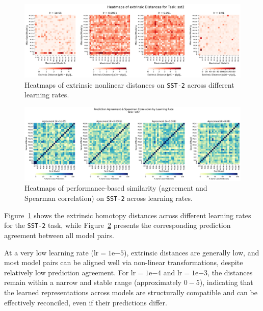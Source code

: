 \begin{figure}[h]
    \centering
    \includegraphics[width=\linewidth]{Abschlussarbeit/Pictures/heatmaps_smaller_circles/Heatmap_extrinsic_distance_all_lrs_sst2_homotopy.png}
    \caption{Heatmaps of extrinsic nonlinear distances on \texttt{SST-2} across different learning rates.}
    \label{fig:extr_sst2}
\end{figure}

\begin{figure}[h]
    \centering
    \includegraphics[width=\linewidth]{Abschlussarbeit/Pictures/PredictionAgreement_Spearman/_3Relu_final_training_HeatMap_sst2_subplots_per_lr_4.png}
    \caption{Heatmaps of performance-based similarity (agreement and Spearman correlation) on \texttt{SST-2} across learning rates.}
    \label{fig:perf_sst2}
\end{figure}

Figure~\ref{fig:extr_sst2} shows the extrinsic homotopy distances across different learning rates for the \texttt{SST-2} task, while Figure~\ref{fig:perf_sst2} presents the corresponding prediction agreement between all model pairs.

At a very low learning rate (\( \text{lr} = 1\mathrm{e}{-5} \)), extrinsic distances are generally low, and most model pairs can be aligned well via non-linear transformations, despite relatively low prediction agreement.  
For \( \text{lr} = 1\mathrm{e}{-4} \) and \( \text{lr} = 1\mathrm{e}{-3} \), the distances remain within a narrow and stable range (approximately $0-5$), indicating that the learned representations across models are structurally compatible and can be effectively reconciled, even if their predictions differ.

